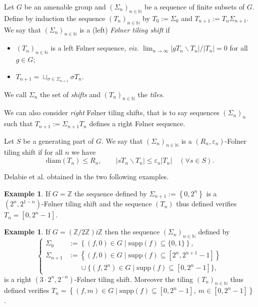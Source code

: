 \documentclass[english, 11pt, a4paper]{article}
\newcommand{\deffont}[1]{\emph{#1}}
\theoremstyle{definition}
\newtheorem{Ex}[Def]{Example}
\numberwithin{equation}{section}
\newcommand{\bN}{\mathbb{N}}
\newcommand{\bZ}{\mathbb{Z}}
\newcommand{\diam}[1]{\mathrm{diam}\left( {#1} \right)}
\newcommand{\supp}{\mathrm{supp}}
\begin{document}
\begin{Def}\label{Def:FOTS}
  Let $G$ be an amenable group and $(\Sigma_n)_{n\in \bN}$ be a sequence of finite subsets
  of $G$. Define by induction the sequence $(T_n)_{n\in \bN}$ by $T_0:=\Sigma_0$ and
  $T_{n+1}:=T_n\Sigma_{n+1}$. We say that $(\Sigma_n)_{n\in \bN}$ is a (left) \deffont{Følner
    tiling shift} if
  \begin{itemize}
  \item $(T_n)_{n\in \bN}$ is a left Følner sequence, \textit{viz.} $\lim_{n \rightarrow \infty} {|gT_n \backslash T_n|}/{|T_n|} = 0$ for all $g\in G$;
  \item $T_{n+1}= \sqcup_{\sigma \in \Sigma_{n+1}} \sigma T_n$.
  \end{itemize}
  We call $\Sigma_n$ the set of \deffont{shifts} and $(T_n)_{n\in
    \bN}$ the \deffont{tiles}.
\end{Def}

We can also consider \emph{right} Følner tiling shifts, that is to say sequences
$(\Sigma_n)_n$ such that $T_{n+1}:=\Sigma_{n+1}T_n$ defines a right Følner
sequence.

\begin{Def}
  Let $S$ be a generating part of $G$. We say that $(\Sigma_n)_{n\in \bN}$ is a
  $(R_n,\varepsilon_n)$-Folner tiling shift if for all $n$ we have
  \begin{equation*}
    \diam{T_n} \leq R_n, \qquad \left\vert sT_n\backslash T_n \right\vert
    \leq \varepsilon_n |T_n| \quad (\forall s\in S).
  \end{equation*}
\end{Def}

Delabie et al. obtained in \cite{DKLMT} the two following examples. 
\begin{Ex}
 If $G=\bZ$ the sequence defined by $\Sigma_{n+1}:= \left\{ 0,2^n
 \right\}$ is a $(2^n,2^{1-n})$-Følner tiling shift and the sequence $(T_n)$
 thus defined verifies $T_n=[0,2^{n}-1]$.
\end{Ex}

\begin{Ex}
  If $G=(\bZ/2\bZ) \wr \bZ$ then the sequence $(\Sigma_n)_{n\in \bN}$ defined by 
  \begin{equation*}
    \begin{cases}
      \Sigma_{0}&:=\left\{ (f,0)\in G \mid \supp(f)\subseteq \{0,1\} \right\},\\
      \Sigma_{n+1}&:= \left\{ (f,0)\in G \mid \supp(f)\subseteq [2^n,2^{n+1}-1] \right\}\\
      &\phantom{:=}\cup \big\{ (f,2^n)\in G \mid \supp(f)\subseteq [0,2^{n}-1] \big\},
    \end{cases}
  \end{equation*}
  is a right $(3\cdot 2^{n},2^{-n})$-Følner tiling shift. Moreover the
  tiling $(T_n)_{n\in \bN}$ thus defined verifies $T_n=\left\{(f,m)\in G \mid
  \supp(f)\subseteq [0,2^{n}-1], \ m \in [0,2^{n}-1] \right\}$. 
\end{Ex}
\end{document}
